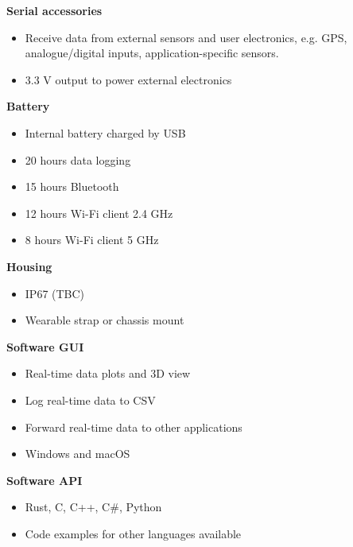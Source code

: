 \begin{multicols}{2}
\textbf{Serial accessories}
\begin{itemize}[nolistsep]
    \item Receive data from external sensors and user electronics, e.g. \acs{GPS}, analogue/digital inputs, application-specific sensors.
    \item 3.3 V output to power external electronics
\end{itemize}

\textbf{Battery}
\begin{itemize}[nolistsep]
    \item Internal battery charged by \acs{USB}
    \item 20 hours data logging
    \item 15 hours Bluetooth
    \item 12 hours Wi-Fi client 2.4 GHz
    \item 8 hours Wi-Fi client 5 GHz
\end{itemize}

\textbf{Housing}
\begin{itemize}[nolistsep]
    \item IP67 (TBC)
    \item Wearable strap or chassis mount
\end{itemize}

\textbf{Software \acs{GUI}}
\begin{itemize}[nolistsep]
    \item Real-time data plots and 3D view
    \item Log real-time data to \acs{CSV}
    \item Forward real-time data to other applications
    \item Windows and macOS
\end{itemize}

\textbf{Software \acs{API}}
\begin{itemize}[nolistsep]
    \item Rust, C, C++, C\#, Python
    \item Code examples for other languages available
\end{itemize}

\end{multicols}

\clearpage

